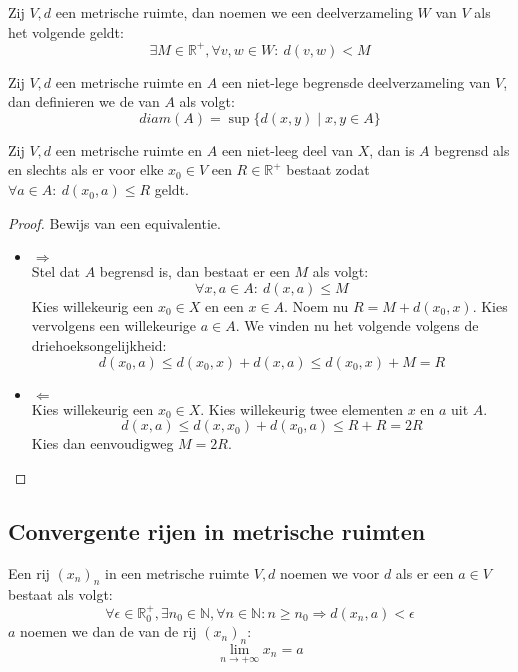 \documentclass[main.tex]{subfiles}
\begin{document}
\begin{de}
  \label{de:metrische-ruimte-begrensde-verzameling}
  Zij $V,d$ een metrische ruimte, dan noemen we een deelverzameling $W$ van $V$  als het volgende geldt:
  \[ \exists M\in \mathbb{R}^{+}, \forall v,w\in W:\ d(v,w) < M \]
\end{de}

\begin{de}
  Zij $V,d$ een metrische ruimte en $A$ een niet-lege begrensde deelverzameling van $V$, dan definieren we de  van $A$ als volgt:
  \[ diam(A) = \sup\{d(x,y) \mid x,y \in A \} \]
\end{de}

\begin{bpr}
  Zij $V,d$ een metrische ruimte en $A$ een niet-leeg deel van $X$, dan is $A$ begrensd als en slechts als er voor elke $x_{0}\in V$ een $R\in \mathbb{R}^{+}$ bestaat zodat $\forall a\in A:\ d(x_{0},a) \le R$ geldt.

  \begin{proof}
    Bewijs van een equivalentie.
    \begin{itemize}
    \item $\Rightarrow$\\
      Stel dat $A$ begrensd is, dan bestaat er een $M$ als volgt:
      \[ \forall x,a \in A:\ d(x,a) \le M \]
      Kies willekeurig een $x_{0}\in X$ en een $x\in A$.
      Noem nu $R=M + d(x_{0},x)$.
      Kies vervolgens een willekeurige $a\in A$.
      We vinden nu het volgende volgens de driehoeksongelijkheid:
      \[ d(x_{0},a) \le d(x_{0},x) + d(x,a) \le d(x_{0},x) + M = R \]
    \item $\Leftarrow$\\
      Kies willekeurig een $x_{0}\in X$.
      Kies willekeurig twee elementen $x$ en $a$ uit $A$.
      \[ d(x,a) \le d(x,x_{0}) + d(x_{0},a) \le R + R = 2R\]
      Kies dan eenvoudigweg $M=2R$.
    \end{itemize}
  \end{proof}
\end{bpr}

\subsection{Convergente rijen in metrische ruimten}
\label{sec:rijen-metr-ruimt}

\begin{de}
  Een rij $(x_{n})_{n}$ in een metrische ruimte $V,d$ noemen we  voor $d$ als er een $a\in V$ bestaat als volgt:
  \[ \forall \epsilon\in\mathbb{R}_{0}^{+}, \exists n_{0}\in \mathbb{N}, \forall n\in \mathbb{N}: n \ge n_{0} \Rightarrow d(x_{n},a) < \epsilon \]
  $a$ noemen we dan de  van de rij $(x_{n})_{n}$:
  \[ \lim_{n\rightarrow +\infty}x_{n} = a \]
\end{de}
\end{document}
